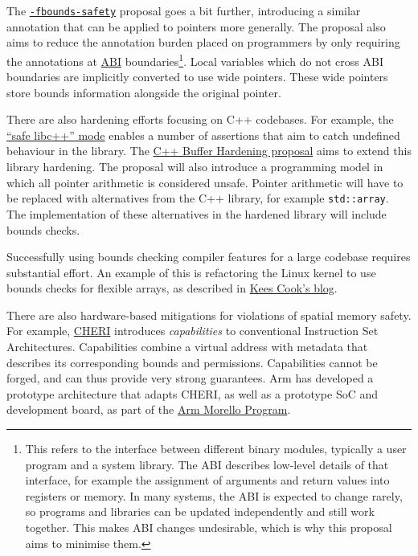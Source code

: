 \documentclass[
  a4paper,
]{report}
\begin{document}
The
\href{https://discourse.llvm.org/t/rfc-enforcing-bounds-safety-in-c-fbounds-safety/70854}{\texttt{-fbounds-safety}}
proposal goes a bit further, introducing a similar annotation that can
be applied to pointers more generally. The proposal also aims to reduce
the annotation burden placed on programmers by only requiring the
annotations at
\href{https://en.wikipedia.org/wiki/Application_binary_interface}{ABI} boundaries\footnote{This refers to the interface
  between different binary modules, typically a user program and a
  system library. The ABI describes low-level details of that interface,
  for example the assignment of arguments and return values into
  registers or memory. In many systems, the ABI is expected to change
  rarely, so programs and libraries can be updated independently and
  still work together. This makes ABI changes undesirable, which is why
  this proposal aims to minimise them.}. Local variables which do not
cross ABI boundaries are implicitly converted to use wide pointers.
These wide pointers store bounds information alongside the original
pointer.

There are also hardening efforts focusing on C++ codebases. For example,
the
\href{https://libcxx.llvm.org/UsingLibcxx.html\#enabling-the-safe-libc-mode}{``safe
libc++'' mode} enables a number of assertions that aim to catch
undefined behaviour in the library. The
\href{https://discourse.llvm.org/t/rfc-c-buffer-hardening/65734}{C++
Buffer Hardening proposal} aims to extend this library hardening. The
proposal will also introduce a programming model in which all pointer
arithmetic is considered unsafe. Pointer arithmetic will have to be
replaced with alternatives from the C++ library, for example
\texttt{std::array}. The implementation of these alternatives in the
hardened library will include bounds checks.

Successfully using bounds checking compiler features for a large
codebase requires substantial effort. An example of this is refactoring
the Linux kernel to use bounds checks for flexible arrays, as described
in \href{\%5B@Cook2023\%5D}{Kees Cook's blog}.

There are also hardware-based mitigations for violations of spatial
memory safety. For example,
\href{https://www.cl.cam.ac.uk/research/security/ctsrd/cheri/}{CHERI}
introduces \emph{capabilities} to conventional
Instruction Set Architectures. Capabilities combine a virtual address
with metadata that describes its corresponding bounds and permissions.
Capabilities cannot be forged, and can thus provide very strong
guarantees. Arm has developed a prototype architecture that adapts
CHERI, as well as a prototype SoC and development board, as part of the
\href{https://www.arm.com/architecture/cpu/morello}{Arm Morello
Program}.
\end{document}
